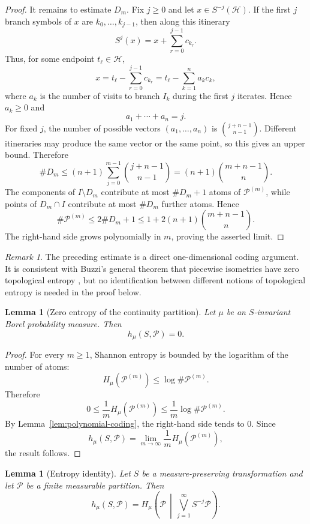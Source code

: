\documentclass[11pt]{amsart}
\theoremstyle{plain}
\newtheorem{lemma}[theorem]{Lemma}
\theoremstyle{definition}
\theoremstyle{remark}
\newtheorem{remark}[theorem]{Remark}
\newcommand{\cP}{\mathcal P}
\newcommand{\cH}{\mathcal H}
\begin{document}
\begin{proof}
It remains to estimate \(D_m\). Fix \(j\geq0\) and let \(x\in S^{-j}(\cH)\). If the first
\(j\) branch symbols of \(x\) are \(k_0,\ldots,k_{j-1}\), then along this itinerary
\[
        S^j(x)=x+\sum_{r=0}^{j-1}c_{k_r}.
\]
Thus, for some endpoint \(t_\ell\in\cH\),
\[
        x=t_\ell-\sum_{r=0}^{j-1}c_{k_r}
         =t_\ell-\sum_{k=1}^n a_kc_k,
\]
where \(a_k\) is the number of visits to branch \(I_k\) during the first \(j\) iterates.
Hence \(a_k\geq0\) and
\[
        a_1+\cdots+a_n=j.
\]
For fixed \(j\), the number of possible vectors \((a_1,\ldots,a_n)\) is
\(\binom{j+n-1}{n-1}\). Different itineraries may produce the same vector or the same point,
so this gives an upper bound. Therefore
\[
        \#D_m
        \leq
        (n+1)\sum_{j=0}^{m-1}\binom{j+n-1}{n-1}
        =
        (n+1)\binom{m+n-1}{n}.
\]
The components of \(I\setminus D_m\) contribute at most \(\#D_m+1\) atoms of
\(\cP^{(m)}\), while points of \(D_m\cap I\) contribute at most \(\#D_m\) further atoms.
Hence
\[
        \#\cP^{(m)}
        \leq
        2\#D_m+1
        \leq
        1+2(n+1)\binom{m+n-1}{n}.
\]
The right-hand side grows polynomially in \(m\), proving the asserted limit.
\end{proof}

\begin{remark}
The preceding estimate is a direct one-dimensional coding argument. It is consistent
with Buzzi's general theorem that piecewise isometries have zero topological entropy
\cite{Buzzi2001}, but no identification between different notions of topological entropy
is needed in the proof below.
\end{remark}

\begin{lemma}[Zero entropy of the continuity partition]\label{lem:zero-partition-entropy}
Let $\mu$ be an $S$-invariant Borel probability measure. Then
\[
        h_\mu(S,\cP)=0.
\]
\end{lemma}

\begin{proof}
For every $m\geq1$, Shannon entropy is bounded by the logarithm of the number of atoms:
\[
        H_\mu(\cP^{(m)})\leq \log \#\cP^{(m)}.
\]
Therefore
\[
        0\leq \frac1m H_\mu(\cP^{(m)})\leq \frac1m\log \#\cP^{(m)}.
\]
By Lemma~\ref{lem:polynomial-coding}, the right-hand side tends to $0$. Since
\[
        h_\mu(S,\cP)=\lim_{m\to\infty}\frac1m H_\mu(\cP^{(m)}),
\]
the result follows.
\end{proof}

\begin{lemma}[Entropy identity]\label{lem:entropy-identity}
Let $S$ be a measure-preserving transformation and let $\cP$ be a finite measurable partition. Then
\[
        h_\mu(S,\cP)=H_\mu\left(\cP\,\middle|\,\bigvee_{j=1}^{\infty}S^{-j}\cP\right).
\]
\end{lemma}
\end{document}
